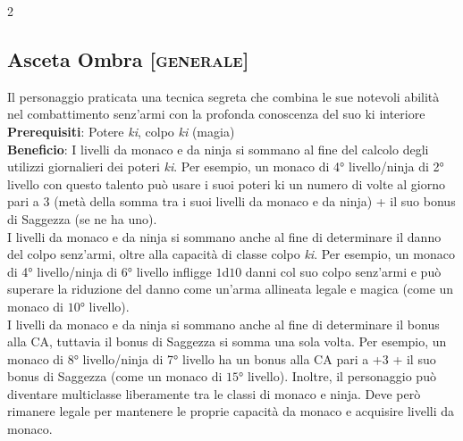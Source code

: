 \documentclass[10pt, a4paper]{report}
\begin{document}
\begin{multicols}{2}
\subsection{Asceta Ombra [\textsc{generale}]}
Il personaggio praticata una tecnica segreta che combina le sue notevoli abilità nel combattimento senz’armi con la profonda conoscenza del suo ki interiore\\
\textbf{Prerequisiti}: Potere \textit{ki}, colpo \textit{ki} (magia)\\
\textbf{Beneficio}: I livelli da monaco e da ninja si sommano al fine del calcolo degli utilizzi giornalieri dei poteri \textit{ki}. Per esempio, un monaco di 4° livello/ninja di 2° livello con questo talento può usare i suoi poteri ki un numero di volte al giorno pari a 3 (metà della somma tra i suoi livelli da monaco e da ninja) + il suo bonus di Saggezza (se ne ha uno).\\
I livelli da monaco e da ninja si sommano anche al fine di determinare il danno del colpo senz'armi, oltre alla capacità di classe colpo \textit{ki}. Per esempio, un monaco di 4° livello/ninja di 6° livello infligge $1$d$10$ danni col suo colpo senz'armi e può superare la riduzione del danno come un'arma allineata legale e magica (come un monaco di $10$° livello).\\
I livelli da monaco e da ninja si sommano anche al fine di determinare il bonus alla CA, tuttavia il bonus di Saggezza si somma una sola volta. Per esempio, un monaco di 8° livello/ninja di 7° livello ha un bonus alla CA pari a +3 + il suo bonus di Saggezza (come un monaco di $15$° livello).
Inoltre, il personaggio può diventare multiclasse liberamente tra le classi di monaco e ninja. Deve però rimanere legale per mantenere le proprie capacità da monaco e acquisire livelli da monaco. 

\end{multicols}
\end{document}

